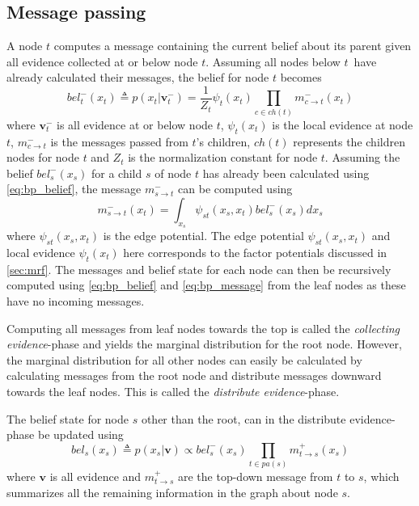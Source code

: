\subsection{Message passing}
A node $t$ computes a message containing the current belief about its parent given all evidence collected at or below node $t$. Assuming all nodes below $t$ have already calculated their messages, the belief for node $t$ becomes
\begin{equation}\label{eq:bp_belief}
    bel_t^-(x_t) \triangleq p(x_t | \mathbf{v}_t^-) = \frac{1}{Z_t}\psi_t(x_t) \prod_{c \in ch(t)} m_{c\to t}^-(x_t)
\end{equation}
where $\mathbf{v}_t^-$ is all evidence at or below node $t$, $\psi_t(x_t)$ is the local evidence at node $t$, $m_{c \to t}^-$ is the messages passed from $t$'s children, $ch(t)$ represents the children nodes for node $t$ and $Z_t$ is the normalization constant for node $t$.
Assuming the belief $bel_s^-(x_s)$ for a child $s$ of node $t$ has already been calculated using \cref{eq:bp_belief},  the message $m_{s\to t}^-$ can be computed using
\begin{equation}\label{eq:bp_message}
    m_{s \to t}^-(x_t) = \int_{x_s} \psi_{st}(x_s, x_t) bel_s^-(x_s) dx_s
\end{equation}
where $\psi_{st}(x_s, x_t)$ is the edge potential. The edge potential $\psi_{st}(x_s, x_t)$ and local evidence $\psi_t(x_t)$ here corresponds to the factor potentials discussed in \cref{sec:mrf}.
The messages and belief state for each node can then be recursively computed using \cref{eq:bp_belief} and \cref{eq:bp_message} from the leaf nodes as these have no incoming messages.



Computing all messages from leaf nodes towards the top is called the \textit{collecting evidence}-phase and yields the marginal distribution for the root node. However, the marginal distribution for all other nodes can easily be calculated by calculating messages from the root node and distribute messages downward towards the leaf nodes. This is called the \textit{distribute evidence}-phase. 

The belief state for node $s$ other than the root, can in the distribute evidence-phase be updated using
\begin{equation}\label{eq:bp_belief_top_down}
    bel_s(x_s) \triangleq p(x_s | \mathbf{v}) \propto bel_s^-(x_s) \prod_{t \in pa(s)} m_{t \to s}^+(x_s)
\end{equation}
where $\mathbf{v}$ is all evidence and $m_{t \to s}^+$ are the top-down message from $t$ to $s$, which summarizes all the remaining information in the graph about node $s$. 

